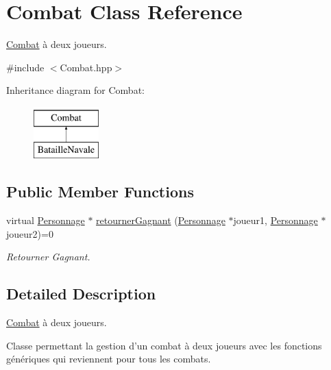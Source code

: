 \hypertarget{classCombat}{\section{Combat Class Reference}
\label{classCombat}
}


\hyperlink{classCombat}{Combat} à deux joueurs.  




{\ttfamily \#include $<$Combat.\-hpp$>$}

Inheritance diagram for Combat\-:\begin{figure}[H]
\begin{center}
\leavevmode
\includegraphics[height=2.000000cm]{classCombat}
\end{center}
\end{figure}
\subsection*{Public Member Functions}
\begin{DoxyCompactItemize}
\item 
virtual \hyperlink{classPersonnage}{Personnage} $\ast$ \hyperlink{classCombat_a5b480832873d1bf4e8a91f1c7054e646}{retourner\-Gagnant} (\hyperlink{classPersonnage}{Personnage} $\ast$joueur1, \hyperlink{classPersonnage}{Personnage} $\ast$joueur2)=0
\begin{DoxyCompactList}\small\item\em Retourner Gagnant. \end{DoxyCompactList}\end{DoxyCompactItemize}


\subsection{Detailed Description}
\hyperlink{classCombat}{Combat} à deux joueurs. 

Classe permettant la gestion d'un combat à deux joueurs avec les fonctions génériques qui reviennent pour tous les combats. 

